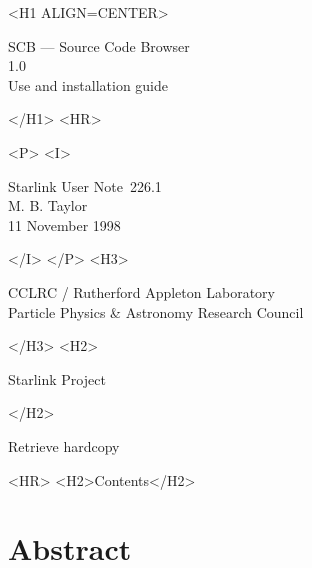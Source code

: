 \documentclass[twoside,11pt]{article}
\newcommand{\stardoccategory}  {Starlink User Note}
\newcommand{\stardocsource}    {sun\stardocnumber}
\newcommand{\stardocnumber}    {226.1}
\newcommand{\stardocauthors}   {M. B. Taylor}
\newcommand{\stardocdate}      {11 November 1998}
\newcommand{\stardoctitle}     {SCB --- Source Code Browser}
\newcommand{\stardocversion}   {1.0}
\newcommand{\stardocmanual}    {Use and installation guide}
\newcommand{\htmladdnormallink}[2]{#1}
\newcommand{\htmladdimg}[1]{}
\newcommand{\htmlref}[2]{#1}
\newcommand{\htmladdtonavigation}[1]{}
\newcommand{\xlabel}[1]{}
\renewcommand{\_}{\texttt{\symbol{95}}}
\begin{document}
\begin{htmlonly}
   \xlabel{}
   \begin{rawhtml} <H1 ALIGN=CENTER> \end{rawhtml}
      \stardoctitle\\
      \stardocversion\\
      \stardocmanual
   \begin{rawhtml} </H1> <HR> \end{rawhtml}


   \begin{rawhtml} <P> <I> \end{rawhtml}
   \stardoccategory\ \stardocnumber \\
   \stardocauthors \\
   \stardocdate
   \begin{rawhtml} </I> </P> <H3> \end{rawhtml}
      \htmladdnormallink{CCLRC}{http://www.cclrc.ac.uk} /
      \htmladdnormallink{Rutherford Appleton Laboratory}
                        {http://www.cclrc.ac.uk/ral} \\
      \htmladdnormallink{Particle Physics \& Astronomy Research Council}
                        {http://www.pparc.ac.uk} \\
   \begin{rawhtml} </H3> <H2> \end{rawhtml}
      \htmladdnormallink{Starlink Project}{http://star-www.rl.ac.uk/}
   \begin{rawhtml} </H2> \end{rawhtml}
   \htmladdnormallink{\htmladdimg{source.gif} Retrieve hardcopy}
      {http://star-www.rl.ac.uk/cgi-bin/hcserver?\stardocsource}\\

  \label{stardoccontents}
  \begin{rawhtml} 
    <HR>
    <H2>Contents</H2>
  \end{rawhtml}
  \htmladdtonavigation{\htmlref{\htmladdimg{contents_motif.gif}}
        {stardoccontents}}

  \section{\xlabel{abstract}Abstract}
\end{htmlonly}
\end{document}
